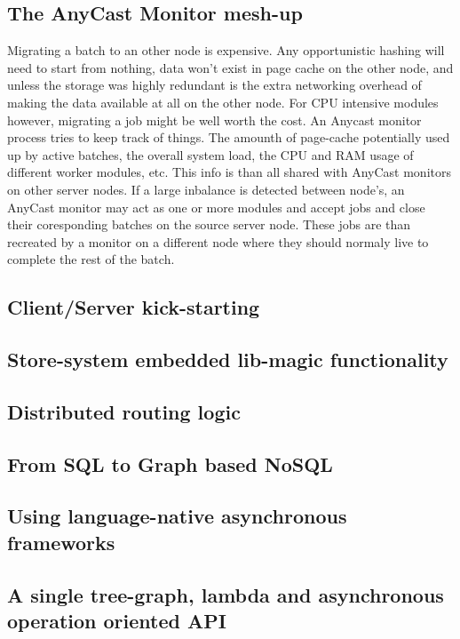 \subsection{The AnyCast Monitor mesh-up}
Migrating a batch to an other node is expensive. Any opportunistic hashing will need to start from nothing, data won't exist in page cache on the other node, and unless the storage was highly redundant is the extra networking overhead of making the data available at all on the other node. For CPU intensive modules however, migrating a job might be well worth the cost. An Anycast monitor process tries to keep track of things. The amounth of page-cache potentially used up by active batches, the overall system load, the CPU and RAM usage of different worker modules, etc. This info is than all shared with AnyCast monitors on other server nodes. If a large inbalance is detected between node's, an AnyCast monitor may act as one or more modules and accept jobs and close their coresponding batches on the source server node. These jobs are than recreated by a monitor on a different node where they should normaly live to complete the rest of the batch.
\subsection{Client/Server kick-starting}
\subsection{Store-system embedded lib-magic functionality}
\subsection{Distributed routing logic}
\subsection{From SQL to Graph based NoSQL}
\subsection{Using language-native asynchronous frameworks}
\subsection{A single tree-graph, lambda and asynchronous operation oriented API}
